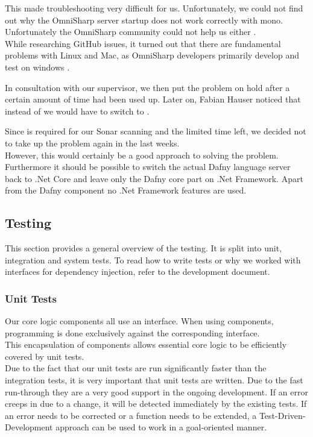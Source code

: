 This made troubleshooting very difficult for us.
Unfortunately, we could not find out why the OmniSharp server startup does not work correctly with mono.
Unfortunately the OmniSharp community could not help us either \cite{mono-slack}.\\

While researching GitHub issues, it turned out that there are fundamental problems with Linux and Mac, as OmniSharp developers primarily develop and test on windows \cite{mono-git}.

In consultation with our supervisor, we then put the problem on hold after a certain amount of time had been used up.
Later on, Fabian Hauser noticed that instead of  we would have to switch to .

Since  is required for our Sonar scanning and the limited time left,
we decided not to take up the problem again in the last weeks. \\

However, this would certainly be a good approach to solving the problem.
Furthermore it should be possible to switch the actual Dafny language server back to .Net Core
and leave only the Dafny core part on .Net Framework.
Apart from the Dafny component no .Net Framework features are used.

\subsection{Testing}

This section provides a general overview of the testing.
It is split into unit, integration and system tests.
To read how to write tests or why we worked with interfaces for dependency injection, refer to the development document.

\subsubsection{Unit Tests}
Our core logic components all use an interface.
When using components, programming is done exclusively against the corresponding interface. \\

This encapsulation of components allows essential core logic to be efficiently covered by unit tests. \\

Due to the fact that our unit tests are run significantly faster than the integration tests, it is very important that unit tests are written.
Due to the fast run-through they are a very good support in the ongoing development.
If an error creeps in due to a change, it will be detected immediately by the existing tests.
If an error needs to be corrected or a function needs to be extended, a Test-Driven-Development approach can be used to work in a goal-oriented manner. \\

